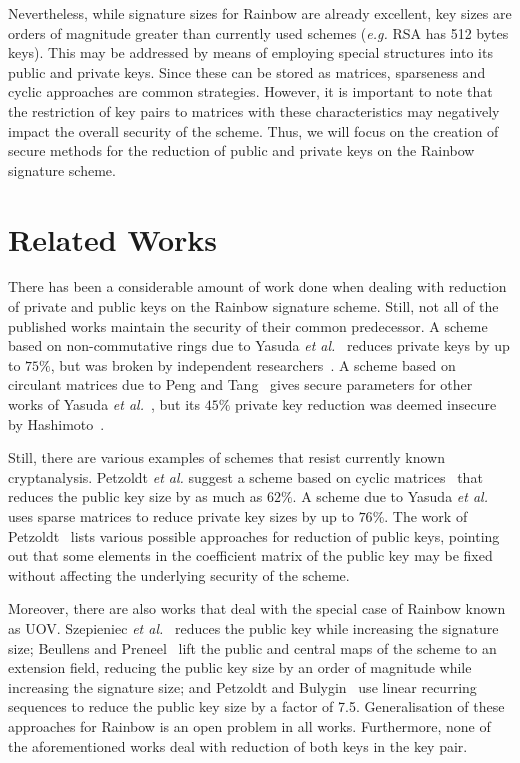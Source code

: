\documentclass[10pt]{article}
\begin{document}
Nevertheless, while signature sizes for Rainbow are already excellent, key sizes are orders of magnitude greater than currently used schemes (\emph{e.g.} RSA has 512 bytes keys). This may be addressed by means of employing special structures into its public and private keys. Since these can be stored as matrices, sparseness and cyclic approaches are common strategies. However, it is important to note that the restriction of key pairs to matrices with these characteristics may negatively impact the overall security of the scheme. Thus, we will focus on the creation of secure methods for the reduction of public and private keys on the Rainbow signature scheme.

\section{Related Works}

There has been a considerable amount of work done when dealing with reduction of private and public keys on the Rainbow signature scheme. Still, not all of the published works maintain the security of their common predecessor. A scheme based on non-commutative rings due to Yasuda \emph{et al.}~\cite{Yasuda:inproc:2012:feb} reduces private keys by up to $75\%$, but was broken by independent researchers~\cite{Hashimoto:inproc:2013:feb,Thomae:inproc:2012:sep}. A scheme based on circulant matrices due to Peng and Tang~\cite{Peng:article:2017:jun} gives secure parameters for other works of Yasuda \emph{et al.}~\cite{Yasuda:inproc:2013:may,Yasuda:inproc:2014:apr}, but its $45\%$ private key reduction was deemed insecure by Hashimoto~\cite{Hashimoto:misc:2018:oct}. 

Still, there are various examples of schemes that resist currently known cryptanalysis. Petzoldt \emph{et al.} suggest a scheme based on cyclic matrices~\cite{Petzoldt:inproc:2010:dec} that reduces the public key size by as much as $62\%$. A scheme due to Yasuda \emph{et al.}~\cite{Yasuda:article:2014:sep} uses sparse matrices to reduce private key sizes by up to $76\%$. The work of Petzoldt~\cite{Petzoldt:phd:2013:jul} lists various possible approaches for reduction of public keys, pointing out that some elements in the coefficient matrix of the public key may be fixed without affecting the underlying security of the scheme. 

Moreover, there are also works that deal with the special case of Rainbow known as UOV. Szepieniec \emph{et al.}~\cite{Szepieniec:inproc:2017:jun} reduces the public key while increasing the signature size; Beullens and Preneel~\cite{Beullens:inproc:2017:dec} lift the public and central maps of the scheme to an extension field, reducing the public key size by an order of magnitude while increasing the signature size; and Petzoldt and Bulygin~\cite{Petzoldt:inproc:2012:nov} use linear recurring sequences to reduce the public key size by a factor of 7.5. Generalisation of these approaches for Rainbow is an open problem in all works. Furthermore, none of the aforementioned works deal with reduction of both keys in the key pair.
\end{document}
